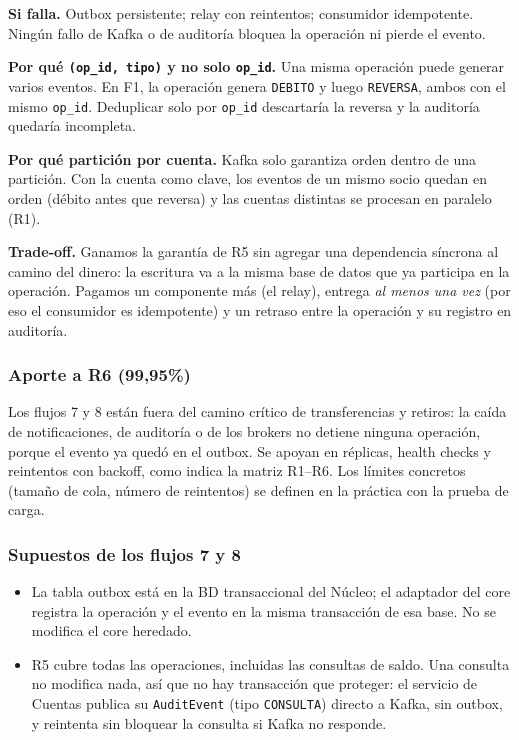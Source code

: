 \documentclass[11pt,a4paper]{article}
\begin{document}
\textbf{Si falla.} Outbox persistente; relay con reintentos; consumidor
idempotente. Ningún fallo de Kafka o de auditoría bloquea la operación ni
pierde el evento.

\textbf{Por qué \texttt{(op\_id, tipo)} y no solo \texttt{op\_id}.} Una misma
operación puede generar varios eventos. En F1, la operación genera
\texttt{DEBITO} y luego \texttt{REVERSA}, ambos con el mismo \texttt{op\_id}.
Deduplicar solo por \texttt{op\_id} descartaría la reversa y la auditoría
quedaría incompleta.

\textbf{Por qué partición por cuenta.} Kafka solo garantiza orden dentro de
una partición. Con la cuenta como clave, los eventos de un mismo socio quedan
en orden (débito antes que reversa) y las cuentas distintas se procesan en
paralelo (R1).

\textbf{Trade-off.} Ganamos la garantía de R5 sin agregar una dependencia
síncrona al camino del dinero: la escritura va a la misma base de datos que ya
participa en la operación. Pagamos un componente más (el relay), entrega
\emph{al menos una vez} (por eso el consumidor es idempotente) y un retraso
entre la operación y su registro en auditoría.

\subsubsection*{Aporte a R6 (99,95\%)}
Los flujos 7 y 8 están fuera del camino crítico de transferencias y retiros:
la caída de notificaciones, de auditoría o de los brokers no detiene ninguna
operación, porque el evento ya quedó en el outbox. Se apoyan en réplicas,
health checks y reintentos con backoff, como indica la matriz R1--R6. Los
límites concretos (tamaño de cola, número de reintentos) se definen en la
práctica con la prueba de carga.

\subsubsection*{Supuestos de los flujos 7 y 8}
\begin{itemize}
  \item La tabla outbox está en la BD transaccional del Núcleo; el adaptador
        del core registra la operación y el evento en la misma transacción de
        esa base. No se modifica el core heredado.
  \item R5 cubre todas las operaciones, incluidas las consultas de saldo.
        Una consulta no modifica nada, así que no hay transacción que
        proteger: el servicio de Cuentas publica su \texttt{AuditEvent}
        (tipo \texttt{CONSULTA}) directo a Kafka, sin outbox, y reintenta
        sin bloquear la consulta si Kafka no responde.
\end{itemize}
\end{document}
